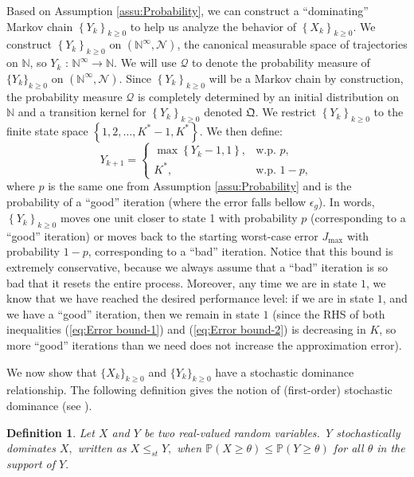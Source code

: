 \documentclass[12pt,technote,onecolumn]{IEEEtran}
\newtheorem{definition}{Definition}
\begin{document}
Based on Assumption \ref{assu:Probability}, we can construct a ``dominating''
Markov chain $\left\{ Y_{k}\right\} _{k\geq0}$ to help us analyze
the behavior of $\left\{ X_{k}\right\} _{k\geq0}$. We construct $\left\{ Y_{k}\right\} _{k\geq0}$
on $\left(\mathbb{N}^{\infty},\mathcal{N}\right)$, the canonical
measurable space of trajectories on $\mathbb{N}$, so $Y_{k}\mbox{ : }\mathbb{N}^{\infty}\rightarrow\mathbb{N}$.
We will use $\mathcal{Q}$ to denote the probability measure of $\{ Y_{k}\} _{k\geq0}$
on $\left(\mathbb{N}^{\infty},\mathcal{N}\right)$. Since $\left\{ Y_{k}\right\} _{k\geq0}$
will be a Markov chain by construction, the probability measure $\mathcal{Q}$
is completely determined by an initial distribution on $\mathbb{N}$
and a transition kernel for $\left\{ Y_{k}\right\} _{k\geq0}$ denoted
$\mathfrak{Q}$. We restrict $\left\{ Y_{k}\right\} _{k\geq0}$ to
the finite state space $\left\{ 1,2,\ldots,K^{*}-1,K^{*}\right\} $.
We then define:
\[
Y_{k+1}=\begin{cases}
\max\left\{ Y_{k}-1,1\right\} , & \mbox{w.p. }p,\\
K^{*}, & \mbox{w.p. }1-p,
\end{cases}
\]
where $p$ is the same one from Assumption \ref{assu:Probability}
and is the probability of a ``good'' iteration (where the error falls
bellow $\epsilon_{g}$). In words, $\left\{ Y_{k}\right\} _{k\geq0}$
moves one unit closer to state 1 with probability $p$ (corresponding
to a ``good'' iteration) or moves back to the starting worst-case
error $J_{\max}$ with probability $1-p$, corresponding to a ``bad''
iteration. Notice that this bound is extremely conservative, because
we always assume that a ``bad'' iteration is so bad that it resets
the entire process. Moreover, any time we are in state $1$, we know
that we have reached the desired performance level: if we are in state
$1$, and we have a ``good'' iteration, then we remain in state $1$
(since the RHS of both inequalities (\ref{eq:Error bound-1}) and
(\ref{eq:Error bound-2}) is decreasing in $K$, so more ``good''
iterations than we need does not increase the approximation error).

We now show that $\{ X_{k}\} _{k\geq0}$ and $\{ Y_{k}\} _{k\geq0}$
have a stochastic dominance relationship. The following definition
gives the notion of (first-order) stochastic dominance (see \cite{Shaked2007}).
\begin{definition}
	Let $X$ and $Y$ be two real-valued random variables. Y stochastically
	dominates $X,$ written as $X\leq_{st}Y,$ when $\mathbb{P}\left(X\geq\theta\right)\leq\mathbb{P}\left(Y\geq\theta\right)$
	for all $\theta$ in the support of $Y.$
\end{definition}
\end{document}
